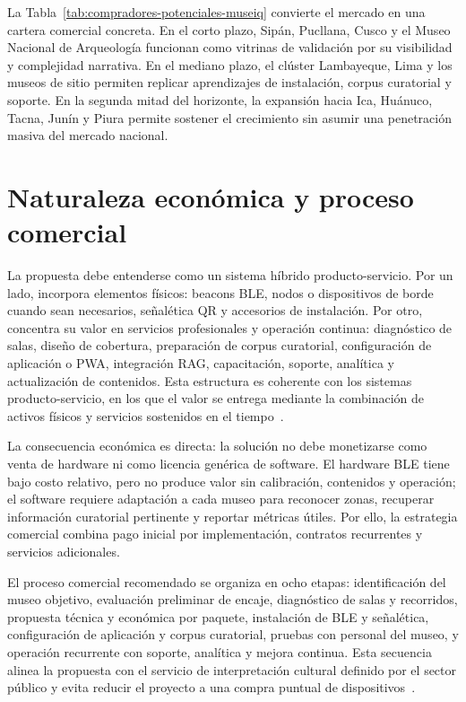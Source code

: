 La Tabla~\ref{tab:compradores-potenciales-museiq} convierte el mercado en una cartera comercial concreta. En el corto plazo, Sipán, Pucllana, Cusco y el Museo Nacional de Arqueología funcionan como vitrinas de validación por su visibilidad y complejidad narrativa. En el mediano plazo, el clúster Lambayeque, Lima y los museos de sitio permiten replicar aprendizajes de instalación, corpus curatorial y soporte. En la segunda mitad del horizonte, la expansión hacia Ica, Huánuco, Tacna, Junín y Piura permite sostener el crecimiento sin asumir una penetración masiva del mercado nacional.

\section{Naturaleza económica y proceso comercial}

La propuesta debe entenderse como un sistema híbrido producto-servicio. Por un lado, incorpora elementos físicos: beacons BLE, nodos o dispositivos de borde cuando sean necesarios, señalética QR y accesorios de instalación. Por otro, concentra su valor en servicios profesionales y operación continua: diagnóstico de salas, diseño de cobertura, preparación de corpus curatorial, configuración de aplicación o PWA, integración RAG, capacitación, soporte, analítica y actualización de contenidos. Esta estructura es coherente con los sistemas producto-servicio, en los que el valor se entrega mediante la combinación de activos físicos y servicios sostenidos en el tiempo~\cite{tukker2004pss}.

La consecuencia económica es directa: la solución no debe monetizarse como venta de hardware ni como licencia genérica de software. El hardware BLE tiene bajo costo relativo, pero no produce valor sin calibración, contenidos y operación; el software requiere adaptación a cada museo para reconocer zonas, recuperar información curatorial pertinente y reportar métricas útiles. Por ello, la estrategia comercial combina pago inicial por implementación, contratos recurrentes y servicios adicionales.

El proceso comercial recomendado se organiza en ocho etapas: identificación del museo objetivo, evaluación preliminar de encaje, diagnóstico de salas y recorridos, propuesta técnica y económica por paquete, instalación de BLE y señalética, configuración de aplicación y corpus curatorial, pruebas con personal del museo, y operación recurrente con soporte, analítica y mejora continua. Esta secuencia alinea la propuesta con el servicio de interpretación cultural definido por el sector público y evita reducir el proyecto a una compra puntual de dispositivos~\cite{cultura2021interpretacion,mef2025guiamuseos}.

